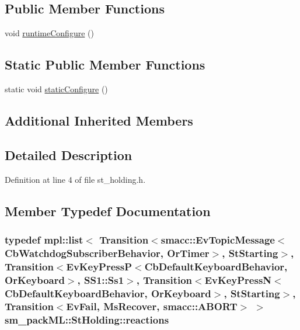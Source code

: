 \subsection*{Public Member Functions}
\begin{DoxyCompactItemize}
\item 
void \hyperlink{structsm__packML_1_1StHolding_a5534f6aeff3d2f5a0d5db2f0f0cd10f3}{runtime\+Configure} ()
\end{DoxyCompactItemize}
\subsection*{Static Public Member Functions}
\begin{DoxyCompactItemize}
\item 
static void \hyperlink{structsm__packML_1_1StHolding_a3603a3a25ae5928eb1a39a480426a1b0}{static\+Configure} ()
\end{DoxyCompactItemize}
\subsection*{Additional Inherited Members}


\subsection{Detailed Description}


Definition at line 4 of file st\+\_\+holding.\+h.



\subsection{Member Typedef Documentation}
\subsubsection[{\texorpdfstring{reactions}{reactions}}]{\setlength{\rightskip}{0pt plus 5cm}typedef mpl\+::list$<$ Transition$<${\bf smacc\+::\+Ev\+Topic\+Message}$<${\bf Cb\+Watchdog\+Subscriber\+Behavior}, {\bf Or\+Timer}$>$, {\bf St\+Starting}$>$, Transition$<$Ev\+Key\+PressP$<$Cb\+Default\+Keyboard\+Behavior, {\bf Or\+Keyboard}$>$, {\bf S\+S1\+::\+Ss1}$>$, Transition$<$Ev\+Key\+PressN$<$Cb\+Default\+Keyboard\+Behavior, {\bf Or\+Keyboard}$>$, {\bf St\+Starting}$>$, Transition$<${\bf Ev\+Fail}, {\bf Ms\+Recover}, {\bf smacc\+::\+A\+B\+O\+RT}$>$ $>$ {\bf sm\+\_\+pack\+M\+L\+::\+St\+Holding\+::reactions}}\hypertarget{structsm__packML_1_1StHolding_ae019299606866ec931fbc4133ea95a6a}{}\label{structsm__packML_1_1StHolding_ae019299606866ec931fbc4133ea95a6a}


